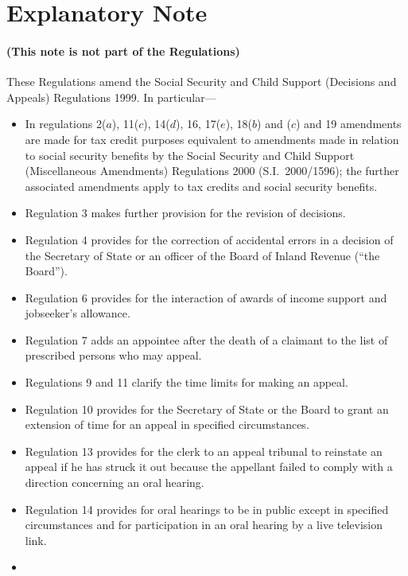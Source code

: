 \documentclass[12pt,a4paper]{article}
\begin{document}
\part{Explanatory Note}

\renewcommand\parthead{— Explanatory Note}

\subsection*{(This note is not part of the Regulations)}

These Regulations amend the Social Security and Child Support (Decisions and Appeals) Regulations 1999. In particular—
\begin{itemize}
\item    In regulations 2($a$), 11($c$), 14($d$), 16, 17($e$), 18($b$)  and ($c$)  and 19 amendments are made for tax credit purposes equivalent to amendments made in relation to social security benefits by the Social Security and Child Support (Miscellaneous Amendments) Regulations 2000 (S.I.\ 2000/1596); the further associated amendments apply to tax credits and social security benefits.
\item
    Regulation 3 makes further provision for the revision of decisions.
\item
    Regulation 4 provides for the correction of accidental errors in a decision of the Secretary of State or an officer of the Board of Inland Revenue (“the Board”).
\item
    Regulation 6 provides for the interaction of awards of income support and jobseeker’s allowance.
\item
    Regulation 7 adds an appointee after the death of a claimant to the list of prescribed persons who may appeal.
\item
    Regulations 9 and 11 clarify the time limits for making an appeal.
\item
    Regulation 10 provides for the Secretary of State or the Board to grant an extension of time for an appeal in specified circumstances.
\item
    Regulation 13 provides for the clerk to an appeal tribunal to reinstate an appeal if he has struck it out because the appellant failed to comply with a direction concerning an oral hearing.
\item
    Regulation 14 provides for oral hearings to be in public except in specified circumstances and for participation in an oral hearing by a live television link.
\item

\end{itemize}
\end{document}
